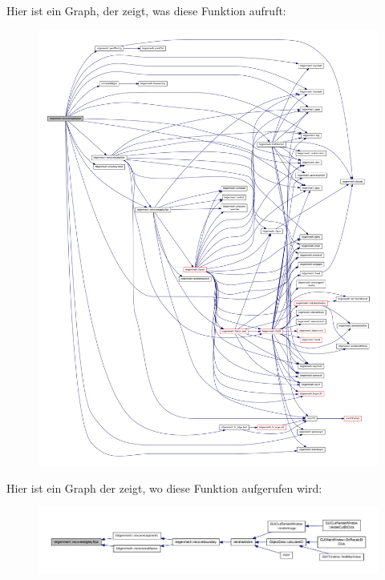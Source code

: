 Hier ist ein Graph, der zeigt, was diese Funktion aufruft\-:\nopagebreak
\begin{figure}[H]
\begin{center}
\leavevmode
\includegraphics[width=350pt]{classtetgenmesh_a558494ab92a7012fae3cfe96bb33f8e9_cgraph}
\end{center}
\end{figure}




Hier ist ein Graph der zeigt, wo diese Funktion aufgerufen wird\-:\nopagebreak
\begin{figure}[H]
\begin{center}
\leavevmode
\includegraphics[width=350pt]{classtetgenmesh_a558494ab92a7012fae3cfe96bb33f8e9_icgraph}
\end{center}
\end{figure}


